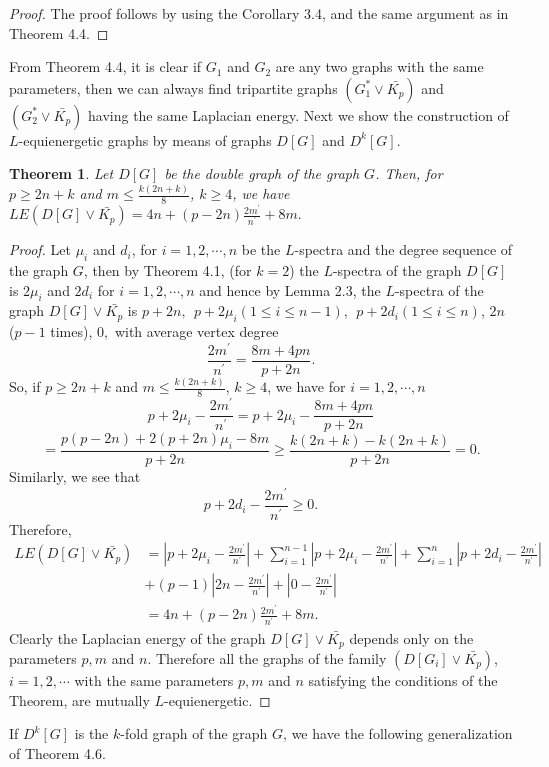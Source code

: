 \documentclass[12pt,a4paper]{amsart}
\newtheorem{theorem}{Theorem}[section]
\theoremstyle{theorem}
\theoremstyle{definition}
\numberwithin{equation}{section} \makeatletter
\begin{document}
 \begin{proof}
 The proof follows by using the Corollary 3.4, and the same argument as in Theorem 4.4.
 \end{proof}
 \indent From Theorem 4.4, it is clear if $G_1$ and $G_2$ are any two graphs with the same parameters, then we can always find tripartite graphs $(G_1^*\vee \bar{K_p})$ and $(G_2^*\vee \bar{K_p})$ having the same Laplacian energy.
 Next we show the construction of $L$-equienergetic graphs by means of graphs $D[G]$ and $D^k[G]$.
 \begin{theorem}
Let $D[G]$ be the double graph of the graph $G$. Then, for $p\geq 2n+k$ and $m\leq \frac{k(2n+k)}{8}$, $k\geq 4$, we have $LE(D[G]\vee \bar{K_p})=4n+(p-2n)\frac{2m^{\prime}}{n^{\prime}}+8m.$
 \end{theorem}
 \begin{proof}
 Let $\mu_i$ and $d_i$, for $i=1,2,\cdots,n$ be the $L$-spectra and the degree sequence of the graph $G$, then by Theorem 4.1, (for $k=2$) the $L$-spectra of the graph $D[G]$ is $2\mu_i$ and $ 2d_i$ for $i=1,2,\cdots,n$ and hence by Lemma 2.3, the $L$-spectra of the graph $D[G]\vee \bar{K_p}$ is $p+2n,~~ p+2\mu_i (1\leq i\leq n-1),~~ p+2d_i (1\leq i\leq n)$, $2n$ ($p-1$ times), $ 0,$ with average vertex degree $$\frac{2m^{\prime}}{n^{\prime}}=\frac{8m+4pn}{p+2n}.$$
 So, if $p\geq 2n+k$ and $m\leq \frac{k(2n+k)}{8}$, $k\geq 4$, we have for $i=1,2,\cdots,n$
 $$p+2\mu_i-\frac{2m^{\prime}}{n^{\prime}}=p+2\mu_i-\frac{8m+4pn}{p+2n}$$ $$=\frac{p(p-2n)+2(p+2n)\mu_i-8m}{p+2n}\geq\frac{k(2n+k)-k(2n+k)}{p+2n}=0.$$
 Similarly, we see that $$p+2d_i-\frac{2m^{\prime}}{n^{\prime}}\geq 0.$$
 Therefore,
 \begin{align*}
 LE(D[G]\vee \bar{K_p})&=|p+2\mu_i-\frac{2m^{\prime}}{n^{\prime}}|+\sum\limits_{i=1}^{n-1}|p+2\mu_i-\frac{2m^{\prime}}{n^{\prime}}|+\sum\limits_{i=1}^{n}|p+2d_i-\frac{2m^{\prime}}{n^{\prime}}|\\&+(p-1)|2n-\frac{2m^{\prime}}{n^{\prime}}|+|0-\frac{2m^{\prime}}{n^{\prime}}|\\&
 =4n+(p-2n)\frac{2m^{\prime}}{n^{\prime}}+8m.
 \end{align*}
 \indent Clearly the Laplacian energy of the graph $D[G]\vee \bar{K_p}$ depends only on the parameters $p, m$ and $n$. Therefore all the graphs of the family $(D[G_i]\vee \bar{K_p})$, $i=1,2,\cdots$ with the same parameters $p, m$ and $n$ satisfying the conditions of the Theorem, are mutually $L$-equienergetic.
 \end{proof}
 \indent If $D^k[G]$ is the $k$-fold graph of the graph $G$, we have the following generalization of Theorem 4.6.
\end{document}
